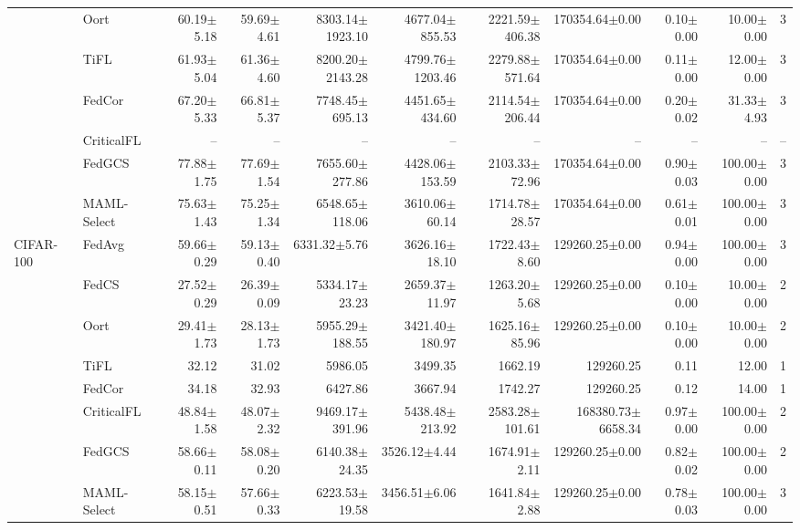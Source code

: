\documentclass[10pt]{article}
\begin{document}
\begin{table}[!ht]
{\begin{tabular}{@{}llrrrrrrrrr@{}}
 & Oort & 60.19$\pm$5.18 & 59.69$\pm$4.61 & 8303.14$\pm$1923.10 & 4677.04$\pm$855.53 & 2221.59$\pm$406.38 & 170354.64$\pm$0.00 & 0.10$\pm$0.00 & 10.00$\pm$0.00 & 3 \\
 & TiFL & 61.93$\pm$5.04 & 61.36$\pm$4.60 & 8200.20$\pm$2143.28 & 4799.76$\pm$1203.46 & 2279.88$\pm$571.64 & 170354.64$\pm$0.00 & 0.11$\pm$0.00 & 12.00$\pm$0.00 & 3 \\
 & FedCor & 67.20$\pm$5.33 & 66.81$\pm$5.37 & 7748.45$\pm$695.13 & 4451.65$\pm$434.60 & 2114.54$\pm$206.44 & 170354.64$\pm$0.00 & 0.20$\pm$0.02 & 31.33$\pm$4.93 & 3 \\
 & CriticalFL & -- & -- & -- & -- & -- & -- & -- & -- & -- \\
 & FedGCS & 77.88$\pm$1.75 & 77.69$\pm$1.54 & 7655.60$\pm$277.86 & 4428.06$\pm$153.59 & 2103.33$\pm$72.96 & 170354.64$\pm$0.00 & 0.90$\pm$0.03 & 100.00$\pm$0.00 & 3 \\
 & MAML-Select & 75.63$\pm$1.43 & 75.25$\pm$1.34 & 6548.65$\pm$118.06 & 3610.06$\pm$60.14 & 1714.78$\pm$28.57 & 170354.64$\pm$0.00 & 0.61$\pm$0.01 & 100.00$\pm$0.00 & 3 \\
\midrule
CIFAR-100 & FedAvg & 59.66$\pm$0.29 & 59.13$\pm$0.40 & 6331.32$\pm$5.76 & 3626.16$\pm$18.10 & 1722.43$\pm$8.60 & 129260.25$\pm$0.00 & 0.94$\pm$0.00 & 100.00$\pm$0.00 & 3 \\
 & FedCS & 27.52$\pm$0.29 & 26.39$\pm$0.09 & 5334.17$\pm$23.23 & 2659.37$\pm$11.97 & 1263.20$\pm$5.68 & 129260.25$\pm$0.00 & 0.10$\pm$0.00 & 10.00$\pm$0.00 & 2 \\
 & Oort & 29.41$\pm$1.73 & 28.13$\pm$1.73 & 5955.29$\pm$188.55 & 3421.40$\pm$180.97 & 1625.16$\pm$85.96 & 129260.25$\pm$0.00 & 0.10$\pm$0.00 & 10.00$\pm$0.00 & 2 \\
 & TiFL & 32.12 & 31.02 & 5986.05 & 3499.35 & 1662.19 & 129260.25 & 0.11 & 12.00 & 1 \\
 & FedCor & 34.18 & 32.93 & 6427.86 & 3667.94 & 1742.27 & 129260.25 & 0.12 & 14.00 & 1 \\
 & CriticalFL & 48.84$\pm$1.58 & 48.07$\pm$2.32 & 9469.17$\pm$391.96 & 5438.48$\pm$213.92 & 2583.28$\pm$101.61 & 168380.73$\pm$6658.34 & 0.97$\pm$0.00 & 100.00$\pm$0.00 & 2 \\
 & FedGCS & 58.66$\pm$0.11 & 58.08$\pm$0.20 & 6140.38$\pm$24.35 & 3526.12$\pm$4.44 & 1674.91$\pm$2.11 & 129260.25$\pm$0.00 & 0.82$\pm$0.02 & 100.00$\pm$0.00 & 2 \\
 & MAML-Select & 58.15$\pm$0.51 & 57.66$\pm$0.33 & 6223.53$\pm$19.58 & 3456.51$\pm$6.06 & 1641.84$\pm$2.88 & 129260.25$\pm$0.00 & 0.78$\pm$0.03 & 100.00$\pm$0.00 & 3 \\
\bottomrule
\end{tabular}%
}
\end{table}
\end{document}
